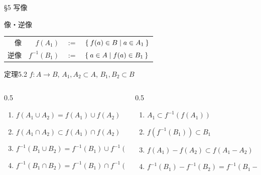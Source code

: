 \documentclass[uplatex,a4paper,dvipdfmx,aspectratio=169,11pt]{beamer}
\begin{document}
\begin{frame}[fragile]{\S 5 写像}
    \begin{block}{像・逆像}
        \begin{tabular}{rrcl} 
            \alert{像} \quad   & $f(A_1)$ & $:= $ & $\Set{ f(a) \in B | a \in A_1}$ \\
            \alert{逆像} \quad & $f^{-1}(B_1)$ & $:= $ & $\Set{ a \in A | f(a) \in B_1}$
        \end{tabular}
    \end{block}
    \medskip

    \begin{block}{定理5.2}
        $f \colon A \to B$, \quad $A_1, A_2 \subset A$, \quad $B_1, B_2 \subset B$
        \begin{columns}
            \begin{column}{0.5\linewidth}
                \begin{enumerate}[(1)]
                    \item $f(A_1 \cup A_2) = f(A_1) \cup f(A_2)$
                    \item $f(A_1 \cap A_2) \subset f(A_1) \cap f(A_2)$
                    \item $f^{-1}(B_1 \cup B_2) = f^{-1}(B_1) \cup f^{-1}(B_2)$
                    \item $f^{-1}(B_1 \cap B_2) = f^{-1}(B_1) \cap f^{-1}(B_2)$
                \end{enumerate}
            \end{column}
            \begin{column}{0.5\linewidth}
                \begin{enumerate}
                    \item[(5)] $A_1 \subset f^{-1}(f(A_1))$
                    \item[(6)] $f(f^{-1}(B_1)) \subset B_1$
                    \item[(7)] $f(A_1) - f(A_2) \subset f(A_1 - A_2)$
                    \item[(8)] $f^{-1}(B_1) - f^{-1}(B_2) = f^{-1}(B_1 - B_2)$
                \end{enumerate}
            \end{column}
        \end{columns}
    \end{block}


    \phantom{逆像の方が像よりよい性質を持っている}
\end{frame}
\end{document}
